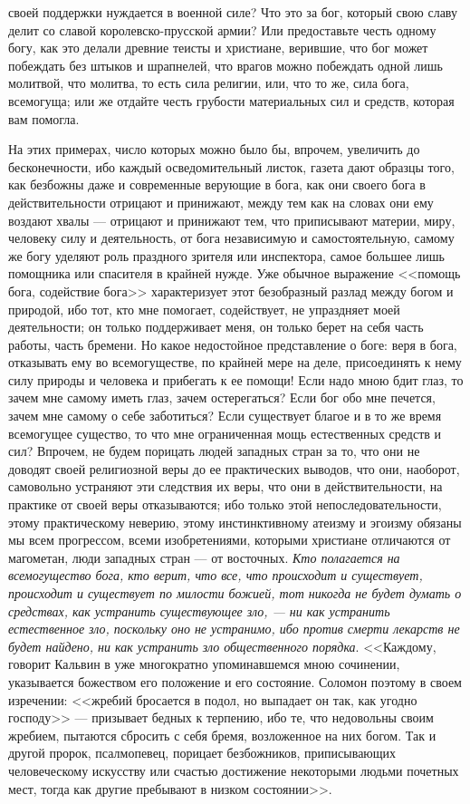 \documentclass[12pt]{article}
\begin{document}
своей поддержки нуждается в военной силе? Что это за бог, который свою славу делит со славой королевско-прусской армии? Или предоставьте честь одному богу, как это делали древние теисты и христиане, верившие, что бог может побеждать без штыков и шрапнелей, что врагов можно побеждать одной лишь молитвой, что молитва, то есть сила религии, или, что то же, сила бога, всемогуща; или же отдайте честь грубости материальных сил и средств, которая вам помогла. 

На этих примерах, число которых можно было бы, впрочем, увеличить до бесконечности, ибо каждый осведомительный листок, газета дают образцы того, как безбожны даже и современные верующие в бога, как они своего бога в действительности отрицают и принижают, между тем как на словах они ему воздают хвалы --- отрицают и принижают тем, что приписывают материи, миру, человеку силу и деятельность, от бога независимую и самостоятельную, самому же богу уделяют роль праздного зрителя или инспектора, самое большее лишь помощника или спасителя в крайней нужде. Уже обычное выражение <<помощь бога, содействие бога>> характеризует этот безобразный разлад между богом и природой, ибо тот, кто мне помогает, содействует, не упраздняет моей деятельности; он только поддерживает меня, он только берет на себя часть работы, часть бремени. Но какое недостойное представление о боге: веря в бога, отказывать ему во всемогуществе, по крайней мере на деле, присоединять к нему силу природы и человека и прибегать к ее помощи! Если надо мною бдит глаз, то зачем мне самому иметь глаз, зачем остерегаться? Если бог обо мне печется, зачем мне самому о себе заботиться? Если существует благое и в то же время всемогущее существо, то что мне ограниченная мощь естественных средств и сил? Впрочем, не будем порицать людей западных стран за то, что они не доводят своей религиозной веры до ее практических выводов, что они, наоборот, самовольно устраняют эти следствия их веры, что они в действительности, на практике от своей веры отказываются; ибо только этой непоследовательности, этому практическому неверию, этому инстинктивному атеизму и эгоизму обязаны мы всем прогрессом, всеми изобретениями, которыми христиане отличаются от магометан, люди западных стран --- от восточных. \emph{Кто полагается на всемогущество бога, кто верит, что все, что происходит и существует, происходит и существует по милости божией, тот никогда не будет думать о средствах, как устранить существующее зло, --- ни как устранить естественное зло, поскольку оно не устранимо, ибо против смерти лекарств не будет найдено, ни как устранить зло общественного порядка}. <<Каждому, говорит Кальвин в уже многократно упоминавшемся мною сочинении, указывается божеством его положение и его состояние. Соломон поэтому в своем изречении: <<жребий бросается в подол, но выпадает он так, как угодно господу>> --- призывает бедных к терпению, ибо те, что недовольны своим жребием, пытаются сбросить с себя бремя, возложенное на них богом. Так и другой пророк, псалмопевец, порицает безбожников, приписывающих человеческому искусству или счастью достижение некоторыми людьми почетных мест, тогда как другие пребывают в низком состоянии>>. 
\end{document}
